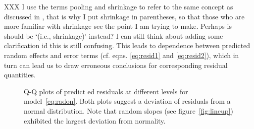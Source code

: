 \documentclass[12pt]{article} %
\newcommand{\hh}[1]{{\color{orange} #1}}
\newcommand{\al}[1]{{\color{red} #1}}
\begin{document}
\al{XXX I use the terms pooling and shrinkage to refer to the same concept as discussed in \cite{Gelman:2006ue}, that is why I put shrinkage in parentheses, so that those who are more familiar with shrinkage see the point I am trying to make. Perhaps is should be `(i.e., shrinkage)' instead? I can still think about adding some clarification id this is still confusing.}
This leads to dependence between  predicted random effects and  error terms (cf. eqns. \ref{eq:resid1} and \ref{eq:resid2}), which in turn can lead us to draw erroneous conclusions for corresponding residual quantities.


\begin{figure}[!h]
	\centering
	\caption{\label{fig:qqplots1} Q-Q plots of predict\al{ed residuals} at different levels %
	for model~\eqref{eq:radon}. \hh{Both plots suggest a deviation of residuals from a normal distribution.} Note that random slopes (see figure~\ref{fig:lineup}) exhibited the largest deviation from normality. }
\end{figure}
\end{document}
